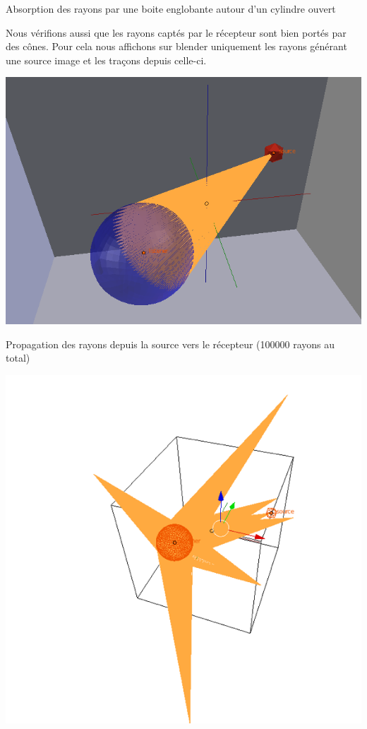\begin{figureth}
\begin{subfigureth}{0.45\textwidth}
		\caption{Absorption des rayons par une boite englobante autour d'un cylindre ouvert}
		\label{test0bis}
	\end{subfigureth}
\end{figureth}

Nous vérifions aussi que les rayons captés par le récepteur sont bien portés par des cônes. Pour cela nous affichons sur blender uniquement les rayons générant une source image et les traçons depuis celle-ci.

\begin{figureth}
	\begin{subfigureth}{0.45\textwidth}
		\includegraphics[width=\linewidth]{images/testBeam}
		\caption{Propagation des rayons depuis la source vers le récepteur (100000 rayons au total)}
		\label{testBeam}
	\end{subfigureth}
	\quad
	\begin{subfigureth}{0.45\textwidth}
		\includegraphics[width=\linewidth]{images/testBeam2}

\end{subfigureth}
\end{figureth}
